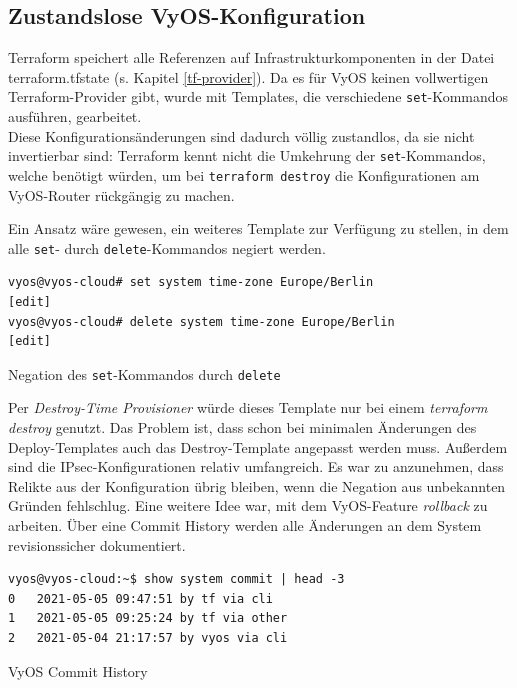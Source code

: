 \subsection{Zustandslose VyOS-Konfiguration}
Terraform speichert alle Referenzen auf Infrastrukturkomponenten in der Datei terraform.tfstate (s. Kapitel \ref{tf-provider}). Da es für VyOS keinen vollwertigen Terraform-Provider gibt, wurde mit Templates, die verschiedene \texttt{set}-Kommandos ausführen, gearbeitet.\\
Diese Konfigurationsänderungen sind dadurch völlig zustandlos, da sie nicht invertierbar sind: Terraform kennt nicht die Umkehrung der \texttt{set}-Kommandos, welche benötigt würden, um bei \texttt{terraform destroy} die Konfigurationen am VyOS-Router rückgängig zu machen.

Ein Ansatz wäre gewesen, ein weiteres Template zur Verfügung zu stellen, in dem alle \texttt{set}- durch \texttt{delete}-Kommandos negiert werden.\\
\begin{listing}[h]
\begin{verbatim}
vyos@vyos-cloud# set system time-zone Europe/Berlin
[edit]
vyos@vyos-cloud# delete system time-zone Europe/Berlin
[edit]
\end{verbatim}
\caption{Negation des \texttt{set}-Kommandos durch \texttt{delete}}
\label{set-delete-vyos}
\end{listing}\FloatBarrier
Per \textit{Destroy-Time Provisioner} würde dieses Template nur bei einem \textit{terraform destroy} genutzt\cite{destroytimeprovtf2021}. Das Problem ist, dass schon bei minimalen Änderungen des Deploy-Templates auch das Destroy-Template angepasst werden muss.
Außerdem sind die \gls{IPsec}-Konfigurationen relativ umfangreich. Es war zu anzunehmen, dass Relikte aus der Konfiguration übrig bleiben, wenn die Negation aus unbekannten Gründen fehlschlug.
Eine weitere Idee war, mit dem VyOS-Feature \textit{rollback} zu arbeiten. Über eine Commit History werden alle Änderungen an dem System revisionssicher dokumentiert.
\begin{listing}[h]
\begin{verbatim}
vyos@vyos-cloud:~$ show system commit | head -3
0   2021-05-05 09:47:51 by tf via cli
1   2021-05-05 09:25:24 by tf via other
2   2021-05-04 21:17:57 by vyos via cli

\end{verbatim}
\caption{VyOS Commit History}
\label{commit-history-vyos}
\end{listing}\FloatBarrier
